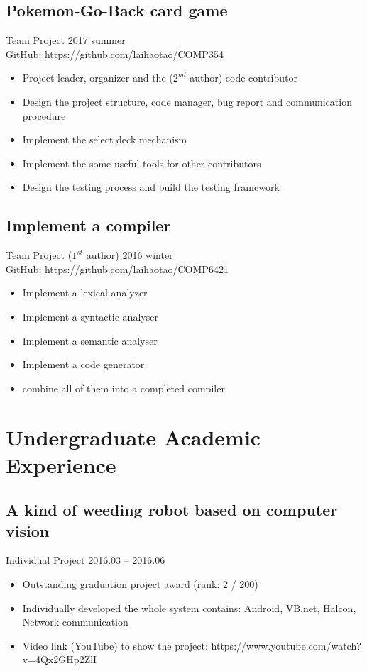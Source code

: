 \documentclass[11pt,a4paper,sans]{moderncv}
\begin{document}
\subsection{Pokemon-Go-Back card game}
Team Project \hfill 2017 summer \\
GitHub: https://github.com/laihaotao/COMP354
\vspace{4pt}
\begin{itemize}
\item Project leader, organizer and the ($2^{nd}$ author) code contributor
\item Design the project structure, code manager, bug report and communication procedure
\item Implement the select deck mechanism
\item Implement the some useful tools for other contributors
\item Design the testing process and build the testing framework
\end{itemize}

\subsection{Implement a compiler}
Team Project ($1^{st}$ author) \hfill 2016 winter \\
GitHub: https://github.com/laihaotao/COMP6421
\vspace{4pt}
\begin{itemize}
\item Implement a lexical analyzer
\item Implement a syntactic analyser
\item Implement a semantic analyser
\item Implement a code generator
\item combine all of them into a completed compiler
\end{itemize}


\section{Undergraduate Academic Experience}
\vspace{4pt}

\subsection{A kind of weeding robot based on computer vision}
Individual Project \hfill 2016.03 -- 2016.06
\vspace{4pt}
\begin{itemize}
\item Outstanding graduation project award (rank: 2 / 200)
\item Individually developed the whole system contains: Android, VB.net, Halcon, Network communication
\item Video link (YouTube) to show the project: https://www.youtube.com/watch?v=4Qx2GHp2ZlI
\end{itemize}
\end{document}
